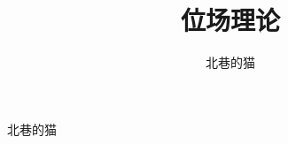 \documentclass[UTF8]{ctexart}
\title{位场理论}
\author{北巷的猫}
\begin{document}
\maketitle           %
北巷的猫
\end{document}

